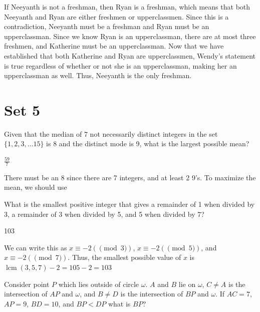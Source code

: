 \documentclass[11pt]{article}
\DeclareMathOperator{\lcm}{lcm}
\begin{document}
\begin{solution}
If Neeyanth is not a freshman, then Ryan is a freshman, which means that both Neeyanth and Ryan are either freshmen or upperclassmen. Since this is a contradiction, Neeyanth must be a freshman and Ryan must be an upperclassman. Since we know Ryan is an upperclassman, there are at most three freshmen, and Katherine must be an upperclassman. Now that we have established that both Katherine and Ryan are upperclassmen, Wendy's statement is true regardless of whether or not she is an upperclassman, making her an upperclassman as well. Thus, Neeyanth is the only freshman.
\end{solution}

\newpage
\section*{Set 5}
\begin{problem}
Given that the median of 7 not necessarily distinct integers in the set $\{1, 2, 3, \dots 15\}$ is 8 and the distinct mode is 9, what is the largest possible mean?
\end{problem}

\begin{answer}
$\frac{59}{7}$
\end{answer}

\begin{solution}
There must be an 8 since there are 7 integers, and at least 2 9's. To maximize the mean, we should use 
\end{solution}

\begin{problem}
 What is the smallest positive integer that gives a remainder of 1 when divided by 3, a remainder of 3 when divided by 5, and 5 when divided by 7?
\end{problem}

\begin{answer}
103
\end{answer}

\begin{solution}
We can write this as $x \equiv -2 (\pmod 3)$, $x \equiv -2 (\pmod 5)$, and $x \equiv -2 (\pmod 7)$. Thus, the smallest possible value of $x$ is $\lcm (3, 5, 7) - 2 = 105-2 = \boxed{103}$
\end{solution}

\begin{problem}
Consider point $P$ which lies outside of circle $\omega$. $A$ and $B$ lie on $\omega$, $C \neq A$ is the intersection of $AP$ and $\omega$, and $B\neq D$ is the intersection of $BP$ and $\omega$. If $AC=7$, $AP=9$, $BD=10$, and $BP < DP$ what is $BP$?
\end{problem}
\end{document}
